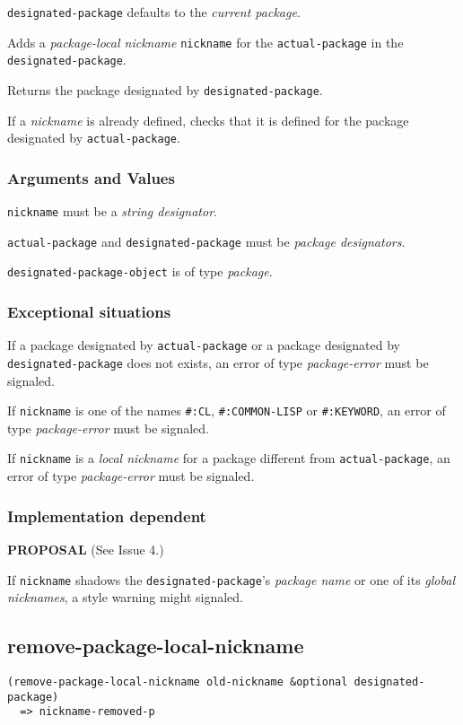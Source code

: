 \documentclass[11pt]{article}
\begin{document}
\texttt{designated-package} defaults to the \emph{current package}.

Adds a \emph{package-local nickname} \texttt{nickname} for the \texttt{actual-package} in the
\texttt{designated-package}.

Returns the package designated by \texttt{designated-package}.

If a \emph{nickname} is already defined, checks that it is defined for the
package designated by \texttt{actual-package}.
\subsubsection{Arguments and Values}
\label{sec:org0489025}
\texttt{nickname} must be a \emph{string designator}.

\texttt{actual-package} and \texttt{designated-package} must be \emph{package designators}.

\texttt{designated-package-object} is of type \emph{package}.
\subsubsection{Exceptional situations}
\label{sec:org05d592d}
If a package designated by \texttt{actual-package} or a package designated by
\texttt{designated-package} does not exists, an error of type \emph{package-error}
must be signaled.

If \texttt{nickname} is one of the names \texttt{\#:CL}, \texttt{\#:COMMON-LISP} or \texttt{\#:KEYWORD},
an error of type \emph{package-error} must be signaled.

If \texttt{nickname} is a \emph{local nickname} for a package different from
\texttt{actual-package}, an error of type \emph{package-error} must be signaled.
\subsubsection{Implementation dependent}
\label{sec:orgfc9ced8}
\textbf{PROPOSAL} (See Issue 4.)

If \texttt{nickname} shadows the \texttt{designated-package}'s \emph{package name} or one of
its \emph{global nicknames}, a style warning might signaled.
\subsection{remove-package-local-nickname}
\label{sec:org3b628fe}
\begin{verbatim}
(remove-package-local-nickname old-nickname &optional designated-package)
  => nickname-removed-p
\end{verbatim}
\end{document}

